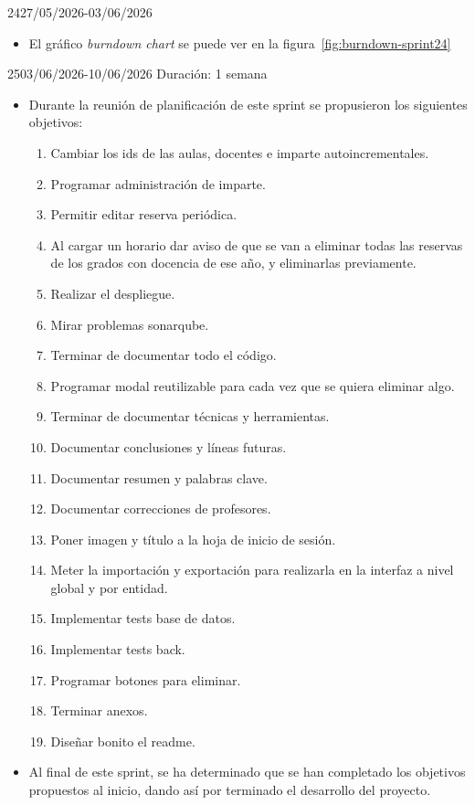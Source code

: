 \begin{Sprint}{24}{27/05/2026-03/06/2026}
\begin{itemize}
		
		\item{}
		El gráfico \textit{burndown chart} se puede ver en la figura~\ref{fig:burndown-sprint24}
	\end{itemize}
\end{Sprint}

\begin{Sprint}{25}{03/06/2026-10/06/2026}
	Duración: 1 semana
	\begin{itemize}	
		\item{}
		Durante la reunión de planificación de este sprint se propusieron los siguientes objetivos:
		\begin{enumerate}
			\item Cambiar los ids de las aulas, docentes e imparte autoincrementales.
			\item Programar administración de imparte.
			\item Permitir editar reserva periódica.
			\item Al cargar un horario dar aviso de que se van a eliminar todas las reservas de los grados con docencia de ese año, y eliminarlas previamente.
			\item Realizar el despliegue.
			\item Mirar problemas sonarqube.
			\item Terminar de documentar todo el código.
			\item Programar modal reutilizable para cada vez que se quiera eliminar algo.
			\item Terminar de documentar técnicas y herramientas.
			\item Documentar conclusiones y líneas futuras.
			\item Documentar resumen y palabras clave.
			\item Documentar correcciones de profesores.
			\item Poner imagen y título a la hoja de inicio de sesión.
			\item Meter la importación y exportación para realizarla en la interfaz a nivel global y por entidad.
			\item Implementar tests base de datos.
			\item Implementar tests back.
			\item Programar botones para eliminar.
			\item Terminar anexos.
			\item Diseñar bonito el readme.
		\end{enumerate}
		\item{}
		Al final de este sprint, se ha determinado que se han completado los objetivos propuestos al inicio, dando así por terminado el desarrollo del proyecto.
		

\end{itemize}
\end{Sprint}

